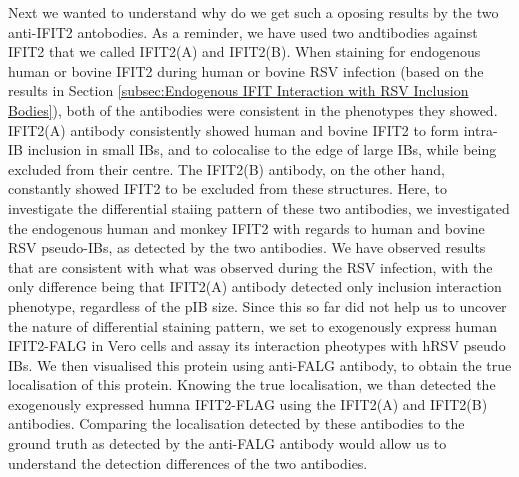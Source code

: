 Next we wanted to understand why do we get such a oposing results by the two anti-IFIT2 antobodies. As a reminder, we have used two andtibodies against IFIT2 that we called IFIT2(A) and IFIT2(B). When staining for endogenous human or bovine IFIT2 during human or bovine RSV infection (based on the results in Section \ref{subsec:Endogenous IFIT Interaction with RSV Inclusion Bodies}), both of the antibodies were consistent in the phenotypes they showed. IFIT2(A) antibody consistently showed human and bovine IFIT2 to form intra-IB inclusion in small IBs, and to colocalise to the edge of large IBs, while being excluded from their centre. The IFIT2(B) antibody, on the other hand, constantly showed IFIT2 to be excluded from these structures. Here, to investigate the differential staiing pattern of these two antibodies, we investigated the endogenous human and monkey IFIT2 with regards to human and bovine RSV pseudo-IBs, as detected by the two antibodies. We have observed results that are consistent with what was observed during the RSV infection, with the only difference being that IFIT2(A) antibody detected only inclusion interaction phenotype, regardless of the pIB size. Since this so far did not help us to uncover the nature of differential staining pattern, we set to exogenously express human IFIT2-FALG in Vero cells and assay its interaction pheotypes with hRSV pseudo IBs. We then visualised this protein using anti-FALG antibody, to obtain the true localisation of this protein. Knowing the true localisation, we than detected the exogenously expressed humna IFIT2-FLAG using the IFIT2(A) and IFIT2(B) antibodies. Comparing the localisation detected by these antibodies to the ground truth as detected by the anti-FALG antibody would allow us to understand the detection differences of the two antibodies.

